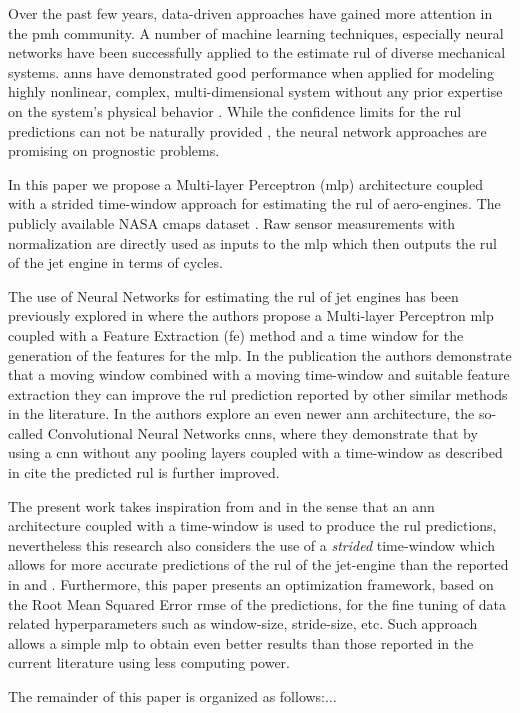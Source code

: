 Over the past few years, data-driven approaches have gained more attention in the \gls{pmh} community. A number of machine learning techniques, especially neural networks have been successfully applied to the estimate \gls{rul} of diverse mechanical systems. \glspl{ann} have demonstrated good performance when applied for modeling highly nonlinear, complex, multi-dimensional system without any prior expertise on the system's physical behavior \cite{Li2018}. While the confidence limits for the \gls{rul} predictions can not be naturally provided \cite{Sikorska2011}, the neural network approaches are promising on prognostic problems.

In this paper we propose a Multi-layer Perceptron (\gls{mlp}) architecture coupled with a strided time-window approach for estimating the \gls{rul} of aero-engines. The publicly available NASA \gls{cmaps} dataset \cite{CMAPS2008}. Raw sensor measurements with normalization are directly used as inputs to the \gls{mlp} which then outputs the \gls{rul} of the jet engine in terms of cycles. 

The use of Neural Networks for estimating the \gls{rul} of jet engines has been previously explored in \cite{Lim2016} where the authors propose a Multi-layer Perceptron \gls{mlp} coupled with a Feature Extraction (\gls{fe}) method and a time window for the generation of the features for the \gls{mlp}. In the publication the authors demonstrate that a moving window combined with a moving time-window and suitable feature extraction they can improve the \gls{rul} prediction reported by other similar methods in the literature. In \cite{Li2018} the authors explore an even newer \gls{ann} architecture, the so-called Convolutional Neural Networks \glspl{cnn}, where they demonstrate that by using a \gls{cnn} without any pooling layers coupled with a time-window as described in \cite{Lim2016} cite the predicted \gls{rul} is further improved.

The present work takes inspiration from \cite{Lim2016} and \cite{Li2018} in the sense that an \gls{ann} architecture coupled with a time-window is used to produce the \gls{rul} predictions, nevertheless this research also considers the use of a \textit{strided} time-window which allows for more accurate predictions of the \gls{rul} of the jet-engine than the reported in \cite{Lim2016} and \cite{Li2018}. Furthermore, this paper presents an optimization framework, based on the Root Mean Squared Error \gls{rmse} of the predictions, for the fine tuning of data related hyperparameters such as window-size, stride-size, etc. Such approach allows a simple \gls{mlp} to obtain even better results than those reported in the current literature using less computing power.

The remainder of this paper is organized as follows:...